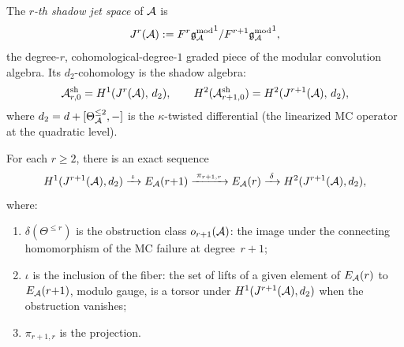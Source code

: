 \begin{definition}
\label{def:shadow-jet-space}
The \emph{$r$-th shadow jet space} of $\mathcal{A}$ is
\begin{equation}\label{eq:shadow-jet-space}
J^r(\mathcal{A}) :=
F^r {\mathfrak{g}_{\mathcal{A}}^{\mathrm{mod}}}^1 / F^{r+1} {\mathfrak{g}_{\mathcal{A}}^{\mathrm{mod}}}^1,
\end{equation}
the degree-$r$, cohomological-degree-$1$ graded piece of
the modular convolution algebra. Its
$d_2$-cohomology is the shadow algebra:
\begin{equation}\label{eq:shadow-jet-cohomology}
\mathcal{A}^{\mathrm{sh}}_{r,0} = H^1(J^r(\mathcal{A}),\, d_2),
\qquad
H^2(\mathcal{A}^{\mathrm{sh}}_{r+1,0})
= H^2(J^{r+1}(\mathcal{A}),\, d_2),
\end{equation}
where $d_2 = d + [\Theta_{\mathcal{A}}^{\leq 2}, -]$ is the
$\kappa$-twisted differential (the linearized MC operator
at the quadratic level).
\end{definition}

\begin{proposition}
\label{prop:obstruction-extension-sequence}
For each $r \geq 2$, there is an exact sequence
\begin{equation}\label{eq:obstruction-exact-sequence}
H^1(J^{r+1}(\mathcal{A}), d_2)
\xrightarrow{\;\iota\;}
E_{\mathcal{A}}(r{+}1)
\xrightarrow{\;\pi_{r+1,r}\;}
E_{\mathcal{A}}(r)
\xrightarrow{\;\delta\;}
H^2(J^{r+1}(\mathcal{A}), d_2),
\end{equation}
where:
\begin{enumerate}[label=\textup{(\roman*)}]
\item $\delta(\Theta^{\leq r})$ is the obstruction class
 $o_{r+1}(\mathcal{A})$: the image under the connecting
 homomorphism of the MC failure at degree~$r{+}1$;
\item $\iota$ is the inclusion of the fiber: the set
 of lifts of a given element of $E_{\mathcal{A}}(r)$ to
 $E_{\mathcal{A}}(r{+}1)$, modulo gauge, is a torsor under
 $H^1(J^{r+1}(\mathcal{A}), d_2)$ when the obstruction vanishes;
\item $\pi_{r+1,r}$ is the projection.
\end{enumerate}
\end{proposition}

